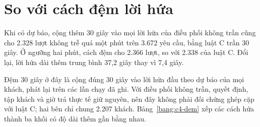 \section{So với cách đệm lời hứa}
\label{muc:c4-dem}

Khi có dự báo, cộng thêm 30 giây vào mọi lời hứa của điều phối không trần cũng cho 2.328 lượt không trễ quá một
phút trên 3.672 yêu cầu, bằng luật C trần 30 giây. Ở ngưỡng hai phút, cách đệm cho 2.366 lượt, so với 2.338 của luật
C. Đổi lại, lời hứa dài thêm trung bình 37,2 giây thay vì 7,4 giây.

Đệm 30 giây ở đây là cộng đúng 30 giây vào lời hứa đầu theo dự báo của mọi khách, phát lại trên các lần chạy đã ghi.
Với điều phối không trần, quyết định, tập khách và giờ trả thực tế giữ nguyên, nên đây không phải đối chứng ghép cặp
với luật C; hai bên chỉ chung 2.207 khách. Bảng~\ref{bang:c4-dem} xếp các cách hứa thành ba khối có độ dài thêm gần
bằng nhau.

